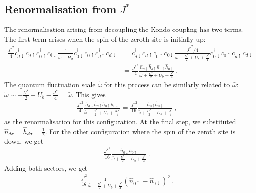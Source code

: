 \documentclass{iopart}
\begin{document}
\subsection{Renormalisation from \(J^*\)}
The renormalisation arising from decoupling the Kondo coupling has two terms. The first term arises when the spin of the zeroth site is initially up:
\begin{eqnarray}
	\frac{{J^*}^2}{4}c^\dagger_{d \downarrow}c_{d \uparrow} c^\dagger_{0 \uparrow}c_{0 \downarrow} \frac{1}{\tilde \omega - H_d} c^\dagger_{0 \downarrow}c_{0 \uparrow} c^\dagger_{d \uparrow}c_{d \downarrow} &= c^\dagger_{d \downarrow}c_{d \uparrow} c^\dagger_{0 \uparrow}c_{0 \downarrow} \frac{{J^*}^2/4}{\tilde \omega + \frac{U^*}{2} + U_b + \frac{J^*}{4}} c^\dagger_{0 \downarrow}c_{0 \uparrow} c^\dagger_{d \uparrow}c_{d \downarrow} \nonumber\\
																										   &= \frac{{J^*}^2}{4}\frac{\hat n_{d \downarrow} \hat h_{d \uparrow} \hat n_{ 0 \uparrow} \hat h_{0 \downarrow}}{\tilde \omega + \frac{U^*}{2} + U_b + \frac{J^*}{4}} ~.
\end{eqnarray}
The quantum fluctuation scale \(\tilde \omega\) for this process can be similarly related to \(\bar\omega\): \(\tilde\omega \sim -\frac{U^*}{2} - U_b - \frac{J^*}{4} = \bar\omega\). This gives
\begin{eqnarray}
	\frac{{J^*}^2}{4}\frac{\hat n_{d \downarrow} \hat h_{d \uparrow} \hat n_{ 0 \uparrow} \hat h_{0 \downarrow}}{\bar\omega + \frac{U^*}{2} + U_b + \frac{3J^*}{4}} = \frac{{J^*}^2}{16}\frac{\hat n_{ 0 \uparrow} \hat h_{0 \downarrow}}{\bar\omega + \frac{U^*}{2} + U_b + \frac{J^*}{4}}~,
\end{eqnarray}
as the renormalisation for this configuration. At the final step, we substituted \(\hat n_{d\sigma} = \hat h_{d\sigma} = \frac{1}{2}\). For the other configuration where the spin of the zeroth site is down, we get
\begin{eqnarray}
	\frac{{J^*}^2}{16}\frac{\hat n_{ 0 \downarrow} \hat h_{0 \uparrow}}{\bar\omega + \frac{U^*}{2} + U_b + \frac{J^*}{4}}~.
\end{eqnarray}
Adding both sectors, we get
\begin{eqnarray}
	\frac{{J^*}^2}{16}\frac{1}{\bar\omega + \frac{U^*}{2} + U_b + \frac{J^*}{4}} \left(\hat n_{ 0\uparrow} - \hat n_{0 \downarrow}\right)^2~.
\end{eqnarray}
\end{document}
